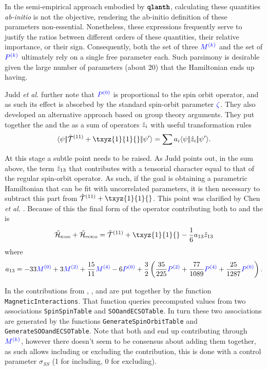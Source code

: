 \documentclass{article}
\newcommand{\codetext}[1]{{\color{BlueViolet} \texttt{#1}}}
\begin{document}
    In the semi-empirical approach embodied by $\textbf{\texttt{qlanth}}$, calculating these quantities \textit{ab-initio} is not the objective, rendering the ab-initio definition of these parameters non-essential. Nonetheless, these expressions frequently serve to justify the ratios between different orders of these quantities, their relative importance, or their sign. Consequently, both the set of three $\textcolor{blue}{M^{(k)}}$ and the set of $\textcolor{blue}{P^{(k)}}$ ultimately rely on a single free parameter each. Such parsimony is desirable given the large number of parameters (about 20) that the Hamiltonian ends up having.

    Judd \textit{et al.} further note that $\textcolor{blue}{P^{(0)}}$ is proportional to the spin orbit operator, and as such its effect is absorbed by the standard spin-orbit parameter $\textcolor{blue}{{\zeta}}$. They also developed an alternative approach based on group theory arguments. They put together the \soo and the \ecso as a sum of operators $\hat{z}_i$ with useful transformation rules 
    \begin{equation}
        \redbraopket{\psi}{\Txyz{1}{1}{} + \txyz{1}{1}{}}{\psi'} = \sum a_i \redbraopket{\psi}{\hat{z}_i}{\psi'}.
    \end{equation}

    At this stage a subtle point needs to be raised. As Judd points out, in the sum above, the term $\hat{z}_{13}$ that contributes with a tensorial character equal to that of the regular spin-orbit operator. As such, if the goal is obtaining a parametric Hamiltonian that can be fit with uncorrelated parameters, it is then necessary to subtract this part from $\Txyz{1}{1}{} + \txyz{1}{1}{}$. This point was clarified by Chen \textit{et al.} \cite{chen_few_2008}. Because of this the final form of the operator contributing both to \soo and the \ecso is
    \begin{equation}
        \hamSpinOtherOrbitSymbol + \hamECSOSymbol = \Txyz{1}{1}{} + \txyz{1}{1}{} - \frac{1}{6}a_{13}\op{z}_{13}
        \label{SOO ECSO sum}
    \end{equation}
    where
    \begin{equation}
        a_{13} = -33 \textcolor{blue}{M^{(0)}} + 3 \textcolor{blue}{M^{(2)}} + \frac{15}{11} \textcolor{blue}{M^{(4)}} - 6 \textcolor{blue}{P^{(0)}} + \frac{3}{2} \left(\frac{35}{225} \textcolor{blue}{P^{(2)}} + \frac{77}{1089} \textcolor{blue}{P^{(4)}} + \frac{25}{1287} \textcolor{blue}{P^{(6)}}\right).
    \end{equation}

    In \qlanth the contributions from \spinspin, \soo, and \ecso are put together by the function \codetext{MagneticInteractions}. That function queries precomputed values from two associations \codetext{SpinSpinTable} and \codetext{SOOandECSOTable}. In turn these two associations are generated by the functions \codetext{GenerateSpinOrbitTable} and \codetext{GenerateSOOandECSOTable}. Note that both \spinspin and \soo end up contributing through $\textcolor{blue}{M^{(k)}}$, however there doesn't seem to be consensus about adding them together, as such \qlanth allows including or excluding the \spinspin contribution, this is done with a control parameter $\sigma_{SS}$ (1 for including, 0 for excluding).
\end{document}
